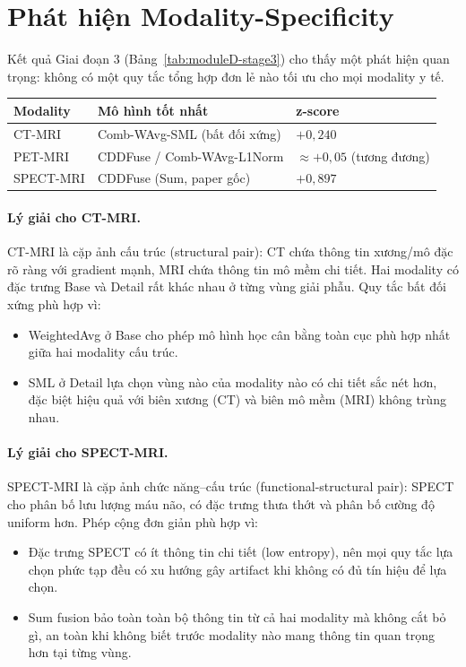 \section{Phát hiện Modality-Specificity}
\label{sec:disc-modality}

Kết quả Giai đoạn 3 (Bảng~\ref{tab:moduleD-stage3}) cho thấy một phát hiện quan trọng: không có một quy tắc tổng hợp đơn lẻ nào tối ưu cho mọi modality y tế.

\begin{center}
\begin{tabular}{lll}
\toprule
\textbf{Modality} & \textbf{Mô hình tốt nhất} & \textbf{z-score} \\
\midrule
CT-MRI    & Comb-WAvg-SML (bất đối xứng)  & $+0{,}240$ \\
PET-MRI   & CDDFuse / Comb-WAvg-L1Norm    & $\approx +0{,}05$ (tương đương) \\
SPECT-MRI & CDDFuse (Sum, paper gốc)       & $+0{,}897$ \\
\bottomrule
\end{tabular}
\end{center}

\paragraph{Lý giải cho CT-MRI.}
CT-MRI là cặp ảnh cấu trúc (structural pair): CT chứa thông tin xương/mô đặc rõ ràng với gradient mạnh, MRI chứa thông tin mô mềm chi tiết. Hai modality có đặc trưng Base và Detail rất khác nhau ở từng vùng giải phẫu. Quy tắc bất đối xứng phù hợp vì:
\begin{itemize}\itemsep0pt
    \item WeightedAvg ở Base cho phép mô hình học cân bằng toàn cục phù hợp nhất giữa hai modality cấu trúc.
    \item SML ở Detail lựa chọn vùng nào của modality nào có chi tiết sắc nét hơn, đặc biệt hiệu quả với biên xương (CT) và biên mô mềm (MRI) không trùng nhau.
\end{itemize}

\paragraph{Lý giải cho SPECT-MRI.}
SPECT-MRI là cặp ảnh chức năng--cấu trúc (functional-structural pair): SPECT cho phân bố lưu lượng máu não, có đặc trưng thưa thớt và phân bố cường độ uniform hơn. Phép cộng đơn giản phù hợp vì:
\begin{itemize}\itemsep0pt
    \item Đặc trưng SPECT có ít thông tin chi tiết (low entropy), nên mọi quy tắc lựa chọn phức tạp đều có xu hướng gây artifact khi không có đủ tín hiệu để lựa chọn.
    \item Sum fusion bảo toàn toàn bộ thông tin từ cả hai modality mà không cắt bỏ gì, an toàn khi không biết trước modality nào mang thông tin quan trọng hơn tại từng vùng.
\end{itemize}

